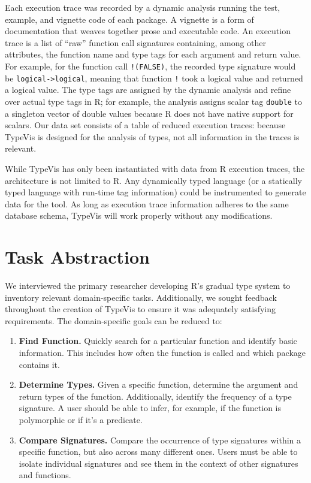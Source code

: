 \documentclass{vgtc}                          %
\newcommand{\code}[1]{\texttt{\small{#1}}}
\newcommand{\typevis}{{\sc TypeVis}\xspace}
\begin{document}
Each execution trace was recorded by a dynamic analysis
running the test, example, and vignette code of each package.
A vignette is a form of documentation that weaves
together prose and executable code.
An execution trace is a list of ``raw'' function call signatures
containing, among other attributes, the function name
and type tags for each argument and return value.
For example, for the function call \code{!(FALSE)},
the recorded type signature would be \code{logical->logical},
meaning that function \code{!} took a logical value and returned a logical value.
The type tags are assigned by the dynamic analysis and
refine over actual type tags in R; for example, the analysis
assigns scalar tag \code{double} to a singleton vector of double values
because R does not have native support for scalars.
Our data set consists of a table of reduced execution traces:
because \typevis is designed for the analysis of types, not all information
in the traces is relevant.

While \typevis has only been instantiated with
data from R execution traces, the architecture is not
limited to R.
Any dynamically typed language %
(or a statically typed language with run-time tag information)
could be instrumented to generate data for the tool.
As long as execution trace information adheres to
the same database schema, \typevis will
work properly without any modifications.


\section{Task Abstraction}

We interviewed the primary researcher developing R's gradual type system
to inventory relevant domain-specific tasks.
Additionally, we sought feedback throughout the creation of \typevis
to ensure it was adequately satisfying requirements.
The domain-specific goals can be reduced to:

\begin{enumerate}
\item {\bf Find Function.} Quickly search for a particular function and identify basic information. This includes how often the function is called and which package contains it.
\item {\bf Determine Types.} Given a specific function, determine the argument and return types of the function. Additionally, identify the frequency of a type signature. A user should be able to infer, for example, if the function is polymorphic or if it's a predicate.
\item {\bf Compare Signatures.} Compare the occurrence of type signatures within a specific function, but also across many different ones. Users must be able to isolate individual signatures and see them in the context of other signatures and functions.
\end{enumerate}
\end{document}
